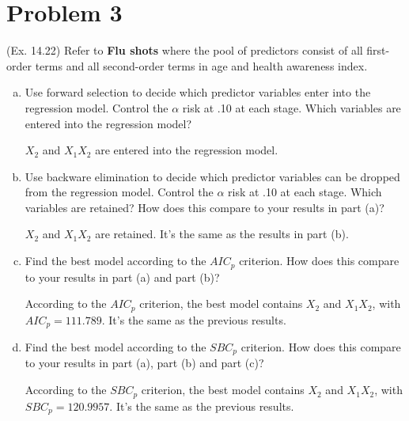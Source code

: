 \documentclass[10pt]{report}
\begin{document}
\section*{Problem 3}
(Ex. 14.22) Refer to \textbf{Flu shots} where the pool of predictors consist of all first-order terms and all second-order terms in age and health awareness index.
\begin{enumerate}[a.]
	\item 
	Use forward selection to decide which predictor variables enter into the regression model. Control the $\alpha$ risk at .10 at each stage. Which variables are entered into the regression model?
	
	$X_2$ and $X_1 X_2$ are entered into the regression model.
	
	\item 
	Use backware elimination to decide which predictor variables can be dropped from the regression model. Control the $\alpha$ risk at .10 at each stage. Which variables are retained? How does this compare to your results in part (a)?
	
	$X_2$ and $X_1 X_2$ are retained. It's the same as the results in part (b).
	
	\item 
	Find the best model according to the $AIC_p$ criterion. How does this compare to your results in part (a) and part (b)?
	
	According to the $AIC_p$ criterion, the best model contains $X_2$ and $X_1 X_2$, with $AIC_p = 111.789$. It's the same as the previous results.
	
	\item 
	Find the best model according to the $SBC_p$ criterion. How does this compare to your results in part (a), part (b) and part (c)?
	
	According to the $SBC_p$ criterion, the best model contains $X_2$ and $X_1 X_2$, with $SBC_p = 120.9957$. It's the same as the previous results.
\end{enumerate}
\end{document}
